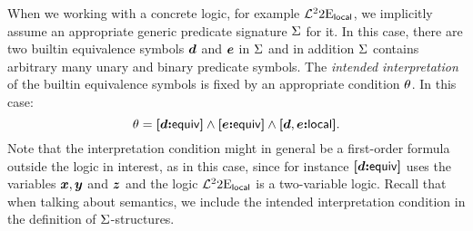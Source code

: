 When we working with a concrete logic, for example
$\mathcal{L}^{2}_{{}}{2}\mathrm{E}_{\mathsf{local}}$,
we implicitly assume an appropriate generic predicate signature $\mathrm{\Sigma}$ for it.
In this case, there are two builtin equivalence symbols $\bm{d}$ and $\bm{e}$ in
$\mathrm{\Sigma}$ and in addition $\mathrm{\Sigma}$ contains arbitrary many unary
and binary predicate symbols.
The \emph{intended interpretation} of the builtin equivalence symbols is fixed
by an appropriate condition $\theta$.
In this case:
\[
  \theta = {\bm{[}\bm{d}\mathord{\bm{:}}\mathsf{equiv}\bm{]}} \land {\bm{[}\bm{e}\mathord{\bm{:}}\mathsf{equiv}\bm{]}} \land {\bm{[}\bm{d},\bm{e}\mathord{\bm{:}}\mathsf{local}\bm{]}}.
\] 
Note that the interpretation condition might in general be a first-order formula
outside the logic in interest, as in this case, since for instance ${\bm{[}\bm{d}\mathord{\bm{:}}\mathsf{equiv}\bm{]}}$
uses the variables $\bm{x},\bm{y}$ and $\bm{z}$ and the logic
$\mathcal{L}^{2}_{{}}{2}\mathrm{E}_{\mathsf{local}}$ is a two-variable logic.
Recall that when talking about semantics, we include the intended interpretation
condition in the definition of $\mathrm{\Sigma}$-structures.
